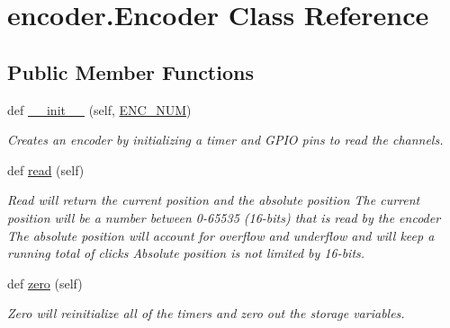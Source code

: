 \hypertarget{classencoder_1_1_encoder}{}\section{encoder.\+Encoder Class Reference}
\label{classencoder_1_1_encoder}
\subsection*{Public Member Functions}
\begin{DoxyCompactItemize}
\item 
def \mbox{\hyperlink{classencoder_1_1_encoder_ae5bcae1276c8381631ead61fbb5286b4}{\+\_\+\+\_\+init\+\_\+\+\_\+}} (self, \mbox{\hyperlink{classencoder_1_1_encoder_ace1f5ee706bd0a9e66ec2a7c1173916b}{E\+N\+C\+\_\+\+N\+UM}})
\begin{DoxyCompactList}\small\item\em Creates an encoder by initializing a timer and G\+P\+IO pins to read the channels. \end{DoxyCompactList}\item 
\mbox{\label{classencoder_1_1_encoder_aa1c1535160682500f5214f45d8197027}} 
def \mbox{\hyperlink{classencoder_1_1_encoder_aa1c1535160682500f5214f45d8197027}{read}} (self)
\begin{DoxyCompactList}\small\item\em Read will return the current position and the absolute position The current position will be a number between 0-\/65535 (16-\/bits) that is read by the encoder The absolute position will account for overflow and underflow and will keep a running total of clicks Absolute position is not limited by 16-\/bits. \end{DoxyCompactList}\item 
\mbox{\label{classencoder_1_1_encoder_ae238ecdbcbce8a193c2e0ffbb4d1dd29}} 
def \mbox{\hyperlink{classencoder_1_1_encoder_ae238ecdbcbce8a193c2e0ffbb4d1dd29}{zero}} (self)
\begin{DoxyCompactList}\small\item\em Zero will reinitialize all of the timers and zero out the storage variables. \end{DoxyCompactList}\end{DoxyCompactItemize}
